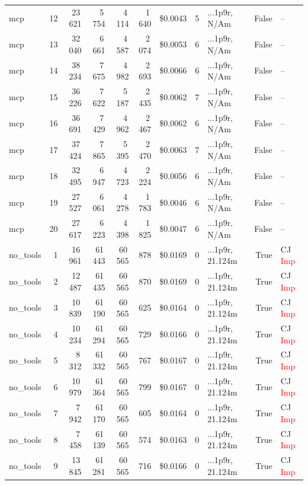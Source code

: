 \documentclass[a4paper,11pt]{article}
\begin{document}
\begin{table}[H]
{\begin{tabular}{l r r r r r r r l r l}
mcp & 12 & 23\,621 & 5\,754 & 4\,114 & 1\,640 & \$0.0043 & 5 & ...1p9r, N/Am & False & -- \\
mcp & 13 & 32\,040 & 6\,661 & 4\,587 & 2\,074 & \$0.0053 & 6 & ...1p9r, N/Am & False & -- \\
mcp & 14 & 38\,234 & 7\,675 & 4\,982 & 2\,693 & \$0.0066 & 6 & ...1p9r, N/Am & False & -- \\
mcp & 15 & 36\,226 & 7\,622 & 5\,187 & 2\,435 & \$0.0062 & 7 & ...1p9r, N/Am & False & -- \\
mcp & 16 & 36\,691 & 7\,429 & 4\,962 & 2\,467 & \$0.0062 & 6 & ...1p9r, N/Am & False & -- \\
mcp & 17 & 37\,424 & 7\,865 & 5\,395 & 2\,470 & \$0.0063 & 7 & ...1p9r, N/Am & False & -- \\
mcp & 18 & 32\,495 & 6\,947 & 4\,723 & 2\,224 & \$0.0056 & 6 & ...1p9r, N/Am & False & -- \\
mcp & 19 & 27\,527 & 6\,061 & 4\,278 & 1\,783 & \$0.0046 & 6 & ...1p9r, N/Am & False & -- \\
mcp & 20 & 27\,617 & 6\,223 & 4\,398 & 1\,825 & \$0.0047 & 6 & ...1p9r, N/Am & False & -- \\
\midrule
no\_tools & 1 & 16\,961 & 61\,443 & 60\,565 & 878 & \$0.0169 & 0 & ...1p9r, 21.124m & True & CJ \textcolor{red}{Imp} \\
no\_tools & 2 & 12\,487 & 61\,435 & 60\,565 & 870 & \$0.0169 & 0 & ...1p9r, 21.124m & True & CJ \textcolor{red}{Imp} \\
no\_tools & 3 & 10\,839 & 61\,190 & 60\,565 & 625 & \$0.0164 & 0 & ...1p9r, 21.124m & True & CJ \textcolor{red}{Imp} \\
no\_tools & 4 & 10\,234 & 61\,294 & 60\,565 & 729 & \$0.0166 & 0 & ...1p9r, 21.124m & True & CJ \textcolor{red}{Imp} \\
no\_tools & 5 & 8\,312 & 61\,332 & 60\,565 & 767 & \$0.0167 & 0 & ...1p9r, 21.124m & True & CJ \textcolor{red}{Imp} \\
no\_tools & 6 & 10\,979 & 61\,364 & 60\,565 & 799 & \$0.0167 & 0 & ...1p9r, 21.124m & True & CJ \textcolor{red}{Imp} \\
no\_tools & 7 & 7\,942 & 61\,170 & 60\,565 & 605 & \$0.0164 & 0 & ...1p9r, 21.124m & True & CJ \textcolor{red}{Imp} \\
no\_tools & 8 & 7\,458 & 61\,139 & 60\,565 & 574 & \$0.0163 & 0 & ...1p9r, 21.124m & True & CJ \textcolor{red}{Imp} \\
no\_tools & 9 & 13\,845 & 61\,281 & 60\,565 & 716 & \$0.0166 & 0 & ...1p9r, 21.124m & True & CJ \textcolor{red}{Imp} \\

\end{tabular}}
\end{table}
\end{document}
